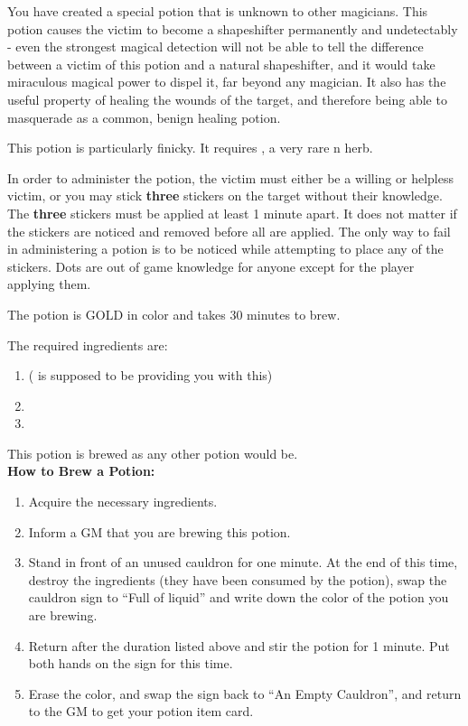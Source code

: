 \documentclass[green]{NeptuneBall}
\begin{document}
\name{\gShapeshifter{}}

You have created a special potion that is unknown to other magicians. This potion causes the victim to become a shapeshifter permanently and undetectably - even the strongest magical detection will not be able to tell the difference between a victim of this potion and a natural shapeshifter, and it would take miraculous magical power to dispel it, far beyond any magician. It also has the useful property of healing the wounds of the target, and therefore being able to masquerade as a common, benign healing potion.

This potion is particularly finicky. It requires \iHemlock{}, a very rare \pPacifica{}n herb.

In order to administer the potion, the victim must either be a willing or helpless victim, or you may stick {\bf three} stickers on the target without their knowledge. The {\bf three} stickers must be applied at least 1 minute apart. It does not matter if the stickers are noticed and removed before all are applied. The only way to fail in administering a potion is to be noticed while attempting to place any of the stickers. Dots are out of game knowledge for anyone except for the player applying them.

The potion is GOLD in color and takes 30 minutes to brew. 

The required ingredients are:
\begin{enumerate}
\item \iHemlock{} (\cSpy{} is supposed to be providing you with this)
\item \iSquid{}
\item \iBarnacle{}
\end{enumerate}

This potion is brewed as any other potion would be.\\

{\bf How to Brew a Potion:}\\ %
\begin{enumerate}
  \item Acquire the necessary ingredients.
	\item Inform a GM that you are brewing this potion.
  \item Stand in front of an unused cauldron for one minute. At the end of this time, destroy the ingredients (they have been consumed by the potion), swap the cauldron sign to ``Full of liquid'' and write down the color of the potion you are brewing.
  \item Return after the duration listed above and stir the potion for 1 minute. Put both hands on the sign for this time.
  \item Erase the color, and swap the sign back to ``An Empty Cauldron'', and return to the GM to get your potion item card.
\end{enumerate}
\end{document}
